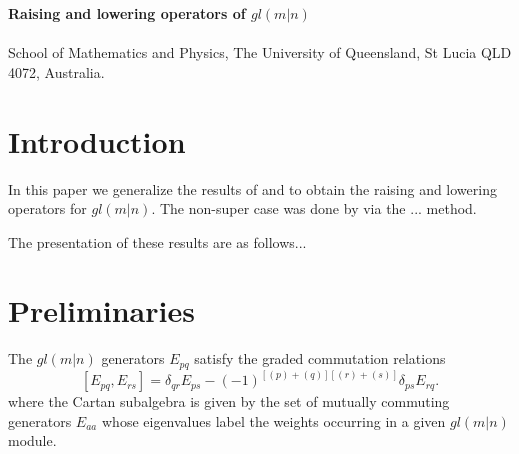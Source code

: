 \documentclass[12pt]{article}
\begin{document}
\begin{center}
{\large\bf Raising and lowering operators of $gl(m|n)$}\\
~~\\


School of Mathematics and Physics, The University of Queensland, St Lucia QLD 4072, Australia.
\end{center}

\begin{abstract}
We obtain the raising and lowering operators for $gl(m|n)$. 
\end{abstract}

% 

\section{Introduction}
 
In this paper we generalize the results of \cite{Gould1978} and \cite{Gould1980} to obtain the raising and lowering operators for $gl(m|n)$. The non-super case was done by \cite{Bin1983} via the ... method.

The presentation of these results are as follows... 



\section{Preliminaries}
\label{prelim}

The $gl(m|n)$ generators $E_{pq}$ satisfy the graded commutation relations
$$
[E_{pq},E_{rs}] = \delta_{qr}E_{ps} - (-1)^{[(p)+(q)][(r)+(s)]}\delta_{ps}E_{rq}.
$$
where the Cartan subalgebra is given by the set of mutually commuting generators $E_{aa}$ 
whose eigenvalues label the weights occurring in a given $gl(m|n)$ module. 
\end{document}
